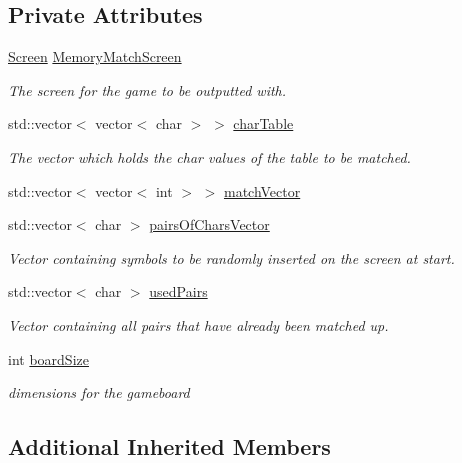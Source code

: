 \subsection*{Private Attributes}
\begin{DoxyCompactItemize}
\item 
\hyperlink{classScreen}{Screen} \hyperlink{classMemoryMatch_a78399975fec5fea7b2102449a4536fcd}{Memory\-Match\-Screen}
\begin{DoxyCompactList}\small\item\em The screen for the game to be outputted with. \end{DoxyCompactList}\item 
std\-::vector$<$ vector$<$ char $>$ $>$ \hyperlink{classMemoryMatch_a06ea18368c12d6b067ff18b389ba86c4}{char\-Table}
\begin{DoxyCompactList}\small\item\em The vector which holds the char values of the table to be matched. \end{DoxyCompactList}\item 
std\-::vector$<$ vector$<$ int $>$ $>$ \hyperlink{classMemoryMatch_a4e49279d32294d1f464751956868b7aa}{match\-Vector}
\item 
std\-::vector$<$ char $>$ \hyperlink{classMemoryMatch_a377424818fa6730a40795ced32e201de}{pairs\-Of\-Chars\-Vector}
\begin{DoxyCompactList}\small\item\em Vector containing symbols to be randomly inserted on the screen at start. \end{DoxyCompactList}\item 
std\-::vector$<$ char $>$ \hyperlink{classMemoryMatch_a0398b30f4ef488ab7b3e1b10b2ecb75c}{used\-Pairs}
\begin{DoxyCompactList}\small\item\em Vector containing all pairs that have already been matched up. \end{DoxyCompactList}\item 
int \hyperlink{classMemoryMatch_aae0a9e51558d70e671fa64aa246de499}{board\-Size}
\begin{DoxyCompactList}\small\item\em dimensions for the gameboard \end{DoxyCompactList}\end{DoxyCompactItemize}
\subsection*{Additional Inherited Members}


